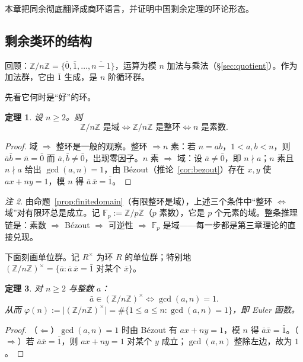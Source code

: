 \documentclass[a4paper,11pt]{ctexart}
\numberwithin{equation}{section}
\theoremstyle{plain}
\newtheorem{theorem}{定理}[section]
\theoremstyle{definition}
\theoremstyle{remark}
\newtheorem{remark}[theorem]{注}
\newcommand{\Z}{\mathbb{Z}}
\newcommand{\F}{\mathbb{F}}
\begin{document}
本章把同余彻底翻译成商环语言，并证明中国剩余定理的环论形态。

\subsection{剩余类环的结构}

回顾：$\Z/n\Z=\{\bar0,\bar1,\dots,\overline{n-1}\}$，运算为模 $n$ 加法与乘法（\S\ref{sec:quotient}）。作为加法群，它由 $\bar 1$ 生成，是 $n$ 阶循环群。

先看它何时是“好”的环。

\begin{theorem}\label{thm:zpzfield}
设 $n\ge 2$。则
\[
\Z/n\Z \text{ 是域} \iff \Z/n\Z \text{ 是整环} \iff n \text{ 是素数}.
\]
\end{theorem}

\begin{proof}
域 $\Rightarrow$ 整环是一般的观察。整环 $\Rightarrow n$ 素：若 $n=ab$，$1<a,b<n$，则 $\bar a\bar b=\bar n=\bar 0$ 而 $\bar a,\bar b\neq\bar0$，出现零因子。$n$ 素 $\Rightarrow$ 域：设 $\bar a\neq\bar 0$，即 $n\nmid a$；$n$ 素且 $n\nmid a$ 给出 $\gcd(a,n)=1$，由 Bézout（推论~\ref{cor:bezout}）存在 $x,y$ 使 $ax+ny=1$，模 $n$ 得 $\bar a\,\bar x=\bar 1$。
\end{proof}

\begin{remark}
由命题~\ref{prop:finitedomain}（有限整环是域），上述三个条件中“整环 $\Leftrightarrow$ 域”对有限环总是成立。记 $\F_p:=\Z/p\Z$（$p$ 素数），它是 $p$ 个元素的域。整条推理链是：素数 $\Rightarrow$ Bézout $\Rightarrow$ 可逆性 $\Rightarrow$ $\F_p$ 是域——每一步都是第三章理论的直接兑现。
\end{remark}

下面刻画单位群。记 $R^{\times}$ 为环 $R$ 的单位群；特别地 $(\Z/n\Z)^{\times}=\{\bar a: \bar a\,\bar x=\bar1 \text{ 对某个 } \bar x\}$。

\begin{theorem}\label{thm:units}
对 $n\ge2$ 与整数 $a$：
\[
\bar a\in(\Z/n\Z)^{\times} \iff \gcd(a,n)=1 .
\]
从而 $\varphi(n):=\big|(\Z/n\Z)^{\times}\big|=\#\{1\le a\le n : \gcd(a,n)=1\}$，即 Euler 函数。
\end{theorem}

\begin{proof}
（$\Leftarrow$）$\gcd(a,n)=1$ 时由 Bézout 有 $ax+ny=1$，模 $n$ 得 $\bar a\bar x=\bar1$。（$\Rightarrow$）若 $\bar a\bar x=\bar1$，则 $ax+ny=1$ 对某个 $y$ 成立；$\gcd(a,n)$ 整除左边，故为 $1$。
\end{proof}
\end{document}
